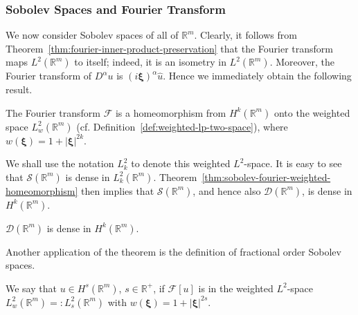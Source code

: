\subsubsection{Sobolev Spaces and Fourier Transform}\label{subsec:sobolev-fourier-characterization}

We now consider Sobolev spaces of all of $\mathbb{R}^m$. Clearly, it follows from Theorem~\ref{thm:fourier-inner-product-preservation} that the Fourier transform maps $L^2(\mathbb{R}^m)$ to itself; indeed, it is an isometry in $L^2(\mathbb{R}^m)$. Moreover, the Fourier transform of $D^\alpha u$ is $(i\bm{\xi})^\alpha\hat u$. Hence we immediately obtain the following result.

\begin{Theorem}
\label{thm:sobolev-fourier-weighted-homeomorphism}
The Fourier transform $\mathcal{F}$ is a homeomorphism from $H^k(\mathbb{R}^m)$ onto the weighted space $L_w^2(\mathbb{R}^m)$ (cf. Definition~\ref{def:weighted-lp-two-space}), where $w(\bm{\xi})=1+|\bm{\xi}|^{2k}$.
\end{Theorem}

We shall use the notation $L_k^2$ to denote this weighted $L^2$-space. It is easy to see that $\mathcal{S}(\mathbb{R}^m)$ is dense in $L_k^2(\mathbb{R}^m)$. Theorem~\ref{thm:sobolev-fourier-weighted-homeomorphism} then implies that $\mathcal{S}(\mathbb{R}^m)$, and hence also $\mathcal{D}(\mathbb{R}^m)$, is dense in $H^k(\mathbb{R}^m)$.

\begin{Corollary}
\label{cor:full-space-test-functions-sobolev-density}
$\mathcal{D}(\mathbb{R}^m)$ is dense in $H^k(\mathbb{R}^m)$.
\end{Corollary}

Another application of the theorem is the definition of fractional order Sobolev spaces.

\begin{Definition}
\label{def:fractional-order-sobolev-fourier}
We say that $u\in H^s(\mathbb{R}^m)$, $s\in\mathbb{R}^+$, if $\mathcal{F}[u]$ is in the weighted $L^2$-space $L_w^2(\mathbb{R}^m)=:L_s^2(\mathbb{R}^m)$ with $w(\bm{\xi})=1+|\bm{\xi}|^{2s}$.
\end{Definition}

